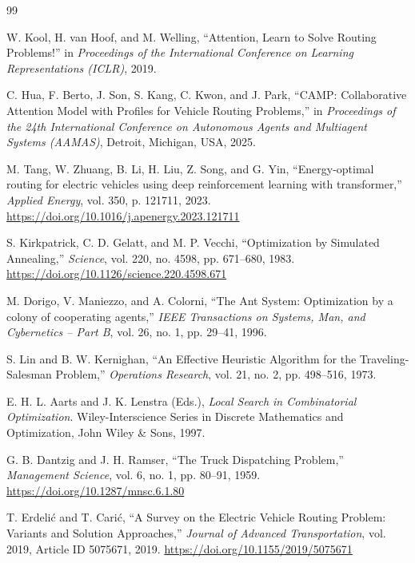 \documentclass[11pt,a4paper]{article}
\begin{document}
\newpage
{}
\begin{thebibliography}{99}

 W. Kool, H. van Hoof, and M. Welling, ``Attention, Learn to Solve Routing Problems!'' in \emph{Proceedings of the International Conference on Learning Representations (ICLR)}, 2019.

 C. Hua, F. Berto, J. Son, S. Kang, C. Kwon, and J. Park, ``CAMP: Collaborative Attention Model with Profiles for Vehicle Routing Problems,'' in \emph{Proceedings of the 24th International Conference on Autonomous Agents and Multiagent Systems (AAMAS)}, Detroit, Michigan, USA, 2025.

 M. Tang, W. Zhuang, B. Li, H. Liu, Z. Song, and G. Yin, ``Energy-optimal routing for electric vehicles using deep reinforcement learning with transformer,'' \emph{Applied Energy}, vol. 350, p. 121711, 2023. \url{https://doi.org/10.1016/j.apenergy.2023.121711}

 S. Kirkpatrick, C. D. Gelatt, and M. P. Vecchi, ``Optimization by Simulated Annealing,'' \emph{Science}, vol. 220, no. 4598, pp. 671--680, 1983. \url{https://doi.org/10.1126/science.220.4598.671}

 M. Dorigo, V. Maniezzo, and A. Colorni, ``The Ant System: Optimization by a colony of cooperating agents,'' \emph{IEEE Transactions on Systems, Man, and Cybernetics -- Part B}, vol. 26, no. 1, pp. 29--41, 1996.

 S. Lin and B. W. Kernighan, ``An Effective Heuristic Algorithm for the Traveling-Salesman Problem,'' \emph{Operations Research}, vol. 21, no. 2, pp. 498--516, 1973.

 E. H. L. Aarts and J. K. Lenstra (Eds.), \emph{Local Search in Combinatorial Optimization}. Wiley-Interscience Series in Discrete Mathematics and Optimization, John Wiley \& Sons, 1997.

 G. B. Dantzig and J. H. Ramser, ``The Truck Dispatching Problem,'' \emph{Management Science}, vol. 6, no. 1, pp. 80--91, 1959. \url{https://doi.org/10.1287/mnsc.6.1.80}

 T. Erdeli\'{c} and T. Cari\'{c}, ``A Survey on the Electric Vehicle Routing Problem: Variants and Solution Approaches,'' \emph{Journal of Advanced Transportation}, vol. 2019, Article ID 5075671, 2019. \url{https://doi.org/10.1155/2019/5075671}


\end{thebibliography}
\end{document}
